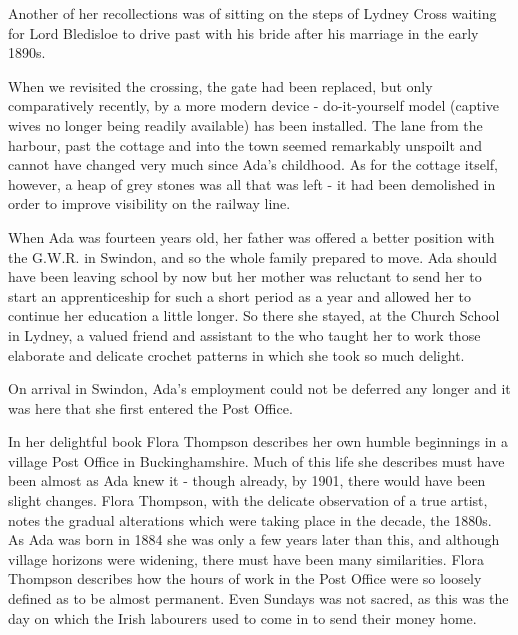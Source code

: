 Another of her recollections was of sitting on the steps of Lydney Cross waiting for Lord Bledisloe to drive past with his bride after his marriage in the early 1890s.

When we revisited the crossing, the gate had been replaced, but only comparatively recently, by a more modern device - do-it-yourself model (captive wives no longer being readily available) has been installed. The lane from the harbour, past the cottage and into the town seemed remarkably unspoilt and cannot have changed very much since Ada’s childhood. As for the cottage itself, however, a heap of grey stones was all that was left - it had been demolished in order to improve visibility on the railway line.

When Ada was fourteen years old, her father was offered a better position with the G.W.R. in Swindon, and so the whole family prepared to move. Ada should have been leaving school by now but her mother was reluctant to send her to start an apprenticeship for such a short period as a year and allowed her to continue her education a little longer. So there she stayed, at the Church School in Lydney, a valued friend and assistant to the  who taught her to work those elaborate and delicate crochet patterns in which she took so much delight.

On arrival in Swindon, Ada's employment could not be deferred any longer and it was here that she first entered the Post Office.

In her delightful book  Flora Thompson describes her own humble beginnings in a village Post Office in Buckinghamshire. Much of this life she describes must have been almost as Ada knew it - though already, by 1901, there would have been slight changes. Flora Thompson, with the delicate observation of a true artist, notes the gradual alterations which were taking place in the decade, the 1880s. As Ada was born in 1884 she was only a few years later than this, and although village horizons were widening, there must have been many similarities. Flora Thompson describes how the hours of work in the Post Office were so loosely defined as to be almost permanent. Even Sundays was not sacred, as this was the day on which the Irish labourers used to come in to send their money home.

